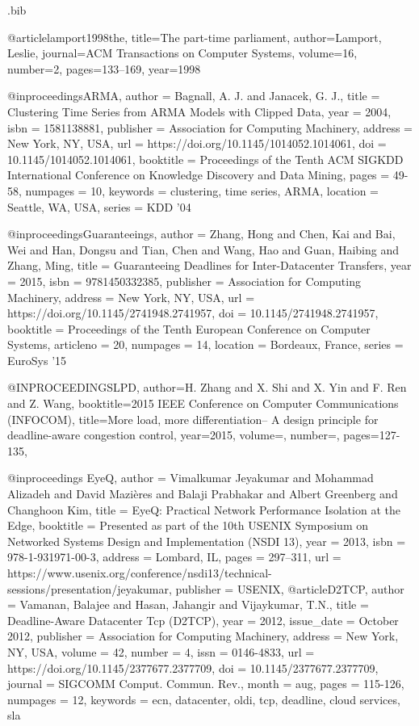 \documentclass[sigconf]{acmart}
\begin{document}
\begin{filecontents}{\jobname.bib}

@article{lamport1998the,
title={The part-time parliament},
author={Lamport, Leslie},
journal={ACM Transactions on Computer Systems},
volume={16},
number={2},
pages={133--169},
year={1998}}
    
    
@inproceedings{ARMA, author = {Bagnall, A. J. and Janacek, G. J.}, title = {Clustering Time Series from ARMA Models with Clipped Data}, year = {2004}, isbn = {1581138881}, publisher = {Association for Computing Machinery}, address = {New York, NY, USA}, url = {https://doi.org/10.1145/1014052.1014061}, doi = {10.1145/1014052.1014061}, booktitle = {Proceedings of the Tenth ACM SIGKDD International Conference on Knowledge Discovery and Data Mining}, pages = {49-58}, numpages = {10}, keywords = {clustering, time series, ARMA}, location = {Seattle, WA, USA}, series = {KDD '04} }


@inproceedings{Guaranteeings, author = {Zhang, Hong and Chen, Kai and Bai, Wei and Han, Dongsu and Tian, Chen and Wang, Hao and Guan, Haibing and Zhang, Ming}, title = {Guaranteeing Deadlines for Inter-Datacenter Transfers}, year = {2015}, isbn = {9781450332385}, publisher = {Association for Computing Machinery}, address = {New York, NY, USA}, url = {https://doi.org/10.1145/2741948.2741957}, doi = {10.1145/2741948.2741957}, booktitle = {Proceedings of the Tenth European Conference on Computer Systems}, articleno = {20}, numpages = {14}, location = {Bordeaux, France}, series = {EuroSys '15} }


@INPROCEEDINGS{LPD,
  author={H. {Zhang} and X. {Shi} and X. {Yin} and F. {Ren} and Z. {Wang}},
  booktitle={2015 IEEE Conference on Computer Communications (INFOCOM)}, 
  title={More load, more differentiation-- A design principle for deadline-aware congestion control}, 
  year={2015},
  volume={},
  number={},
  pages={127-135},}
  
  
@inproceedings {EyeQ,
author = {Vimalkumar Jeyakumar and Mohammad Alizadeh and David Mazi{\`e}res and Balaji Prabhakar and Albert Greenberg and Changhoon Kim},
title = {EyeQ: Practical Network Performance Isolation at the Edge},
booktitle = {Presented as part of the 10th {USENIX} Symposium on Networked Systems Design and Implementation ({NSDI} 13)},
year = {2013},
isbn = {978-1-931971-00-3},
address = {Lombard, IL},
pages = {297--311},
url = {https://www.usenix.org/conference/nsdi13/technical-sessions/presentation/jeyakumar},
publisher = {{USENIX}},
}
@article{D2TCP, author = {Vamanan, Balajee and Hasan, Jahangir and Vijaykumar, T.N.}, title = {Deadline-Aware Datacenter Tcp (D2TCP)}, year = {2012}, issue_date = {October 2012}, publisher = {Association for Computing Machinery}, address = {New York, NY, USA}, volume = {42}, number = {4}, issn = {0146-4833}, url = {https://doi.org/10.1145/2377677.2377709}, doi = {10.1145/2377677.2377709}, journal = {SIGCOMM Comput. Commun. Rev.}, month = aug, pages = {115-126}, numpages = {12}, keywords = {ecn, datacenter, oldi, tcp, deadline, cloud services, sla} }




\end{filecontents}
\end{document}
